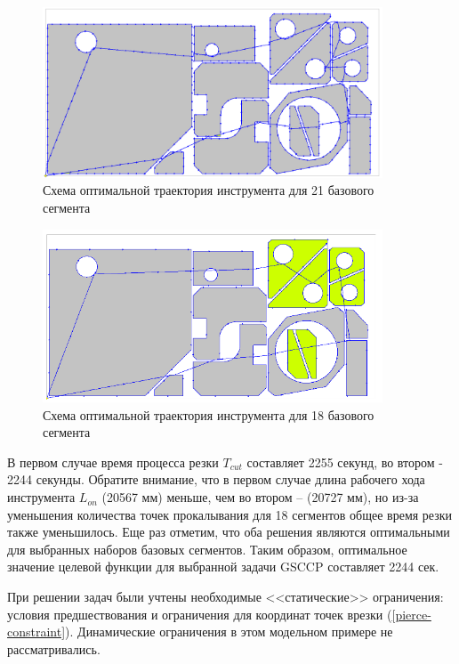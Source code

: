 \documentclass[11pt,twoside]{report}
\begin{document}
\begin{figure}
  \begin{center}
  \includegraphics[width=0.9\textwidth]{path21.png}
  \caption{Схема оптимальной траектория инструмента для 21 базового сегмента}
  \label{path21}
  \end{center}
\end{figure}

\begin{figure}
  \begin{center}
  \includegraphics[width=0.9\textwidth]{path18.png}
  \caption{Схема оптимальной траектория инструмента для 18 базового сегмента}
  \label{path18}
  \end{center}
\end{figure}

В первом случае время процесса резки
$T_{cut}$
составляет 2255 секунд,
во втором - 2244 секунды.
Обратите внимание, что в первом случае длина рабочего хода инструмента
$L_{on}$
(20567 мм) меньше, чем во втором – (20727 мм),
но из-за уменьшения количества точек прокалывания
для 18 сегментов общее время резки также уменьшилось.
Еще раз отметим, что оба решения являются оптимальными
для выбранных наборов базовых сегментов.
Таким образом, оптимальное значение целевой
функции для выбранной задачи GSCCP составляет 2244 сек.

При решении задач были учтены необходимые <<статические>> ограничения:
условия предшествования и ограничения для координат
точек врезки (\ref{pierce-constraint}).
Динамические ограничения в этом модельном примере не рассматривались.
\end{document}
